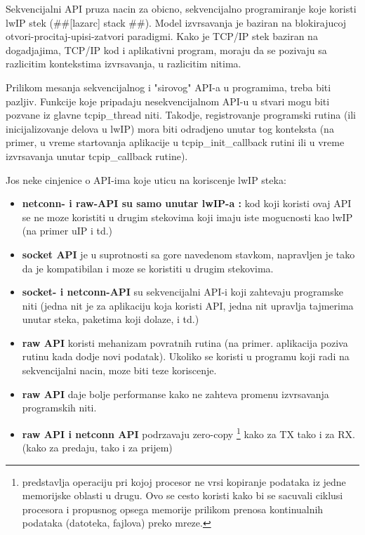 \documentclass[a4paper,12pt, master]{etf}
\begin{document}
	Sekvencijalni API pruza nacin za obicno, sekvencijalno programiranje koje koristi lwIP stek
	(\#\#[lazarc] stack \#\#). Model izvrsavanja je baziran na blokirajucoj
	otvori-procitaj-upisi-zatvori paradigmi. Kako je TCP/IP stek baziran na dogadjajima, TCP/IP kod
	i aplikativni program, moraju da se pozivaju sa razlicitim kontekstima izvrsavanja, u
	razlicitim nitima.

	Prilikom mesanja sekvencijalnog i "sirovog" API-a u programima, treba biti pazljiv. Funkcije
	koje pripadaju nesekvencijalnom API-u u stvari mogu biti pozvane iz glavne tcpip\_thread niti.
	Takodje, registrovanje programski rutina (ili inicijalizovanje delova u lwIP) mora biti
	odradjeno unutar tog konteksta (na primer, u vreme startovanja aplikacije u tcpip\_init\_callback
	rutini ili u vreme izvrsavanja unutar tcpip\_callback rutine).

	Jos neke cinjenice o API-ima koje uticu na koriscenje lwIP steka:
	\begin{itemize}
		\item \textbf{netconn- i raw-API su samo unutar lwIP-a :} kod koji koristi ovaj API se ne
		moze koristiti u drugim stekovima koji imaju iste mogucnosti kao lwIP (na primer uIP i td.)
		\item \textbf{socket API} je u suprotnosti sa gore navedenom stavkom, napravljen je tako da
		je kompatibilan i moze se koristiti u drugim stekovima.
		\item \textbf{socket- i netconn-API} su sekvencijalni API-i koji zahtevaju programske niti
		(jedna nit je za aplikaciju koja koristi API, jedna nit upravlja tajmerima unutar steka,
		paketima koji dolaze, i td.)
		\item \textbf{raw API} koristi mehanizam povratnih rutina (na primer. aplikacija poziva
		rutinu kada dodje novi podatak). Ukoliko se koristi u programu koji radi na sekvencijalni
		nacin, moze biti teze koriscenje.
		\item \textbf{raw API} daje bolje performanse kako ne zahteva promenu izvrsavanja
		programskih niti.
		\item \textbf{raw API i netconn API} podrzavaju zero-copy \footnote{predstavlja operaciju
		pri kojoj procesor ne vrsi kopiranje podataka iz jedne memorijske oblasti u drugu. Ovo se
		cesto koristi kako bi se sacuvali ciklusi procesora i propusnog opsega memorije prilikom
		prenosa kontinualnih podataka (datoteka, fajlova) preko mreze.} kako za TX tako i za RX.
		(kako za predaju, tako i za prijem)
	\end{itemize}
\end{document}
